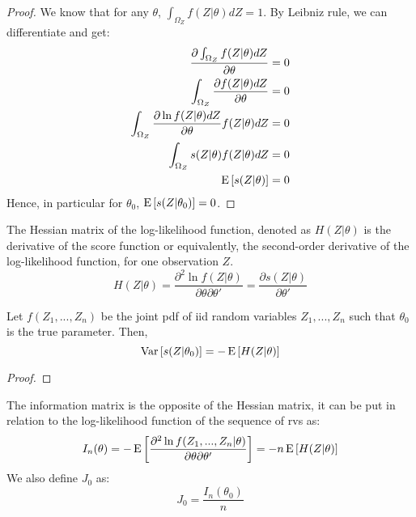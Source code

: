 \begin{proof}
We know that for any $\theta$, $\int_{\Omega_Z} f(Z\vert\theta)dZ = 1$. By Leibniz rule, we can differentiate and get:\begin{align*}
\frac{\partial \int_{\Omega_Z} f(Z\vert\theta)dZ}{\partial \theta} & = 0 \\ \int_{\Omega_Z} \frac{\partial f(Z\vert\theta)dZ}{\partial \theta} & = 0 \\ \int_{\Omega_Z} \frac{\partial \ln f(Z\vert\theta)dZ}{\partial \theta} f(Z\vert\theta)dZ  & = 0 \\ \int_{\Omega_Z} s(Z\vert\theta) f(Z\vert\theta)dZ  & = 0 \\ \operatorname{E}\left[s(Z\vert\theta)\right]&=0
\end{align*} Hence, in particular for $\theta_0$, $\operatorname{E}\left[s(Z\vert\theta_0)\right]=0$.
\end{proof}

\begin{definition}
The Hessian matrix of the log-likelihood function, denoted as $H(Z\vert\theta)$ is the derivative of the score function or equivalently, the second-order derivative of the log-likelihood function, for one observation $Z$. $$H(Z\vert\theta) = \frac{\partial^2 \ln f(Z\vert \theta)}{\partial \theta\partial\theta'} = \frac{\partial s(Z\vert \theta)}{\partial\theta'}$$
\end{definition}

\begin{proposition}
Let $f(Z_1, ..., Z_n)$ be the joint pdf of iid random variables $Z_1, ..., Z_n$ such that $\theta_0$ is the true parameter. Then, $$\operatorname{Var}\left[s(Z\vert\theta_0)\right]=-\operatorname{E}\left[H(Z\vert\theta)\right]$$
\end{proposition}

\begin{proof}

\end{proof}

\begin{definition}
The information matrix is the opposite of the Hessian matrix, it can be put in relation to the log-likelihood function of the sequence of rvs as: $$I_n(\theta) = -\operatorname{E}\left[\frac{\partial^2 \ln f(Z_1, ..., Z_n\vert \theta)}{\partial \theta\partial\theta'}\right] = - n\operatorname{E}\left[H(Z\vert\theta)\right]$$ We also define $J_0$ as: $$J_0 = \frac{I_n(\theta_0)}{n} $$
\end{definition}


